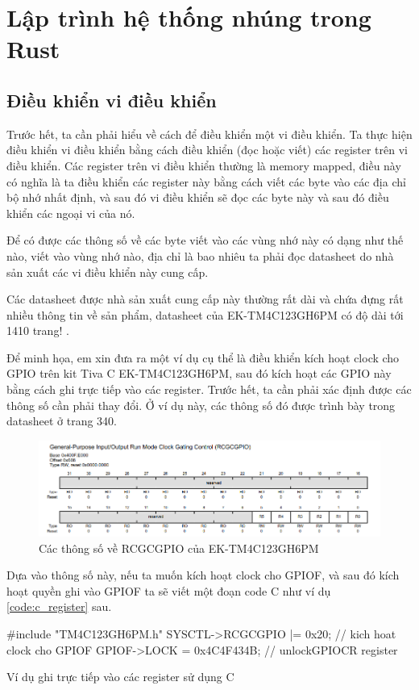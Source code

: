 \chapter{Lập trình hệ thống nhúng trong Rust}
\section{Điều khiển vi điều khiển}
Trước hết, ta cần phải hiểu về cách để điều khiển một vi điều khiển.
Ta thực hiện điều khiển vi điều khiển bằng cách điều khiển (đọc hoặc viết) các register trên vi điều khiển.
Các register trên vi điều khiển thường là memory mapped, điều này có nghĩa là ta điều khiển các register này bằng cách viết các byte vào các địa chỉ bộ nhớ nhất định, và sau đó vi điều khiển sẽ đọc các byte này và sau đó điều khiển các ngoại vi của nó.

Để có được các thông số về các byte viết vào các vùng nhớ này có dạng như thế nào, viết vào vùng nhớ nào, địa chỉ là bao nhiêu ta phải đọc datasheet do nhà sản xuất các vi điều khiển này cung cấp.

Các datasheet được nhà sản xuất cung cấp này thường rất dài và chứa đựng rất nhiều thông tin về sản phẩm, datasheet của EK-TM4C123GH6PM có độ dài tới 1410 trang! \cite{tivac_datasheet}.

Để minh họa, em xin đưa ra một ví dụ cụ thể là điều khiển kích hoạt clock cho GPIO trên kit Tiva C EK-TM4C123GH6PM, sau đó kích hoạt các GPIO này bằng cách ghi trực tiếp vào các register.
Trước hết, ta cần phải xác định được các thông số cần phải thay đổi. Ở ví dụ này, các thông số đó được trình bày trong datasheet ở trang 340.
\begin{figure}[ht]
\centering
\includegraphics[scale=0.5]{images/tivac_datasheet_example.png}
\caption{Các thông số về RCGCGPIO của EK-TM4C123GH6PM}
\end{figure}

Dựa vào thông số này, nếu ta muốn kích hoạt clock cho GPIOF, và sau đó kích hoạt quyền ghi vào GPIOF ta sẽ viết một đoạn code C như ví dụ \ref{code:c_register} sau.
\begin{listing}[ht]
\begin{ccode}
#include "TM4C123GH6PM.h"
SYSCTL->RCGCGPIO |= 0x20; // kich hoat clock cho GPIOF
GPIOF->LOCK = 0x4C4F434B; // unlockGPIOCR register
\end{ccode}
\caption{Ví dụ ghi trực tiếp vào các register sử dụng C}
\label{code:c_register}
\end{listing}

